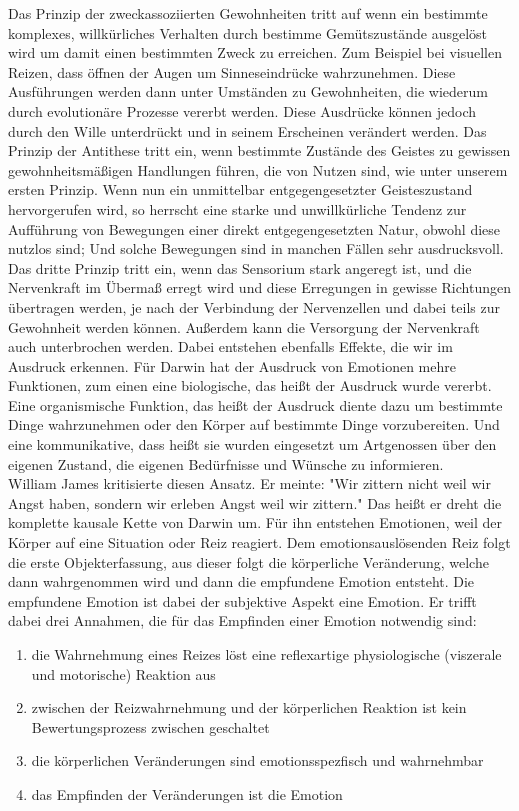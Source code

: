 Das Prinzip der zweckassoziierten Gewohnheiten tritt auf wenn ein bestimmte komplexes, willkürliches Verhalten durch bestimme Gemütszustände ausgelöst wird um damit einen bestimmten Zweck zu erreichen. Zum Beispiel bei visuellen Reizen, dass öffnen der Augen um Sinneseindrücke wahrzunehmen. Diese Ausführungen werden dann unter Umständen zu Gewohnheiten, die wiederum durch evolutionäre Prozesse vererbt werden. Diese Ausdrücke können jedoch durch den Wille unterdrückt und in seinem Erscheinen verändert werden. Das Prinzip der Antithese tritt ein, wenn bestimmte Zustände des Geistes zu gewissen gewohnheitsmäßigen Handlungen führen, die von Nutzen sind, wie unter unserem ersten Prinzip. Wenn nun ein unmittelbar entgegengesetzter Geisteszustand hervorgerufen wird, so herrscht eine starke und unwillkürliche Tendenz zur Aufführung von Bewegungen einer direkt entgegengesetzten Natur, obwohl diese nutzlos sind; Und solche Bewegungen sind in manchen Fällen sehr ausdrucksvoll. Das dritte Prinzip tritt ein, wenn das Sensorium stark angeregt ist, und die Nervenkraft im Übermaß erregt wird und diese Erregungen in gewisse Richtungen übertragen werden, je nach der Verbindung der Nervenzellen und dabei teils zur Gewohnheit werden können. Außerdem kann die Versorgung der Nervenkraft auch unterbrochen werden. Dabei entstehen ebenfalls Effekte, die wir im Ausdruck erkennen.
Für Darwin hat der Ausdruck von Emotionen mehre Funktionen, zum einen eine biologische, das heißt der Ausdruck wurde vererbt. Eine organismische Funktion, das heißt der Ausdruck diente dazu um bestimmte Dinge wahrzunehmen oder den Körper auf bestimmte Dinge vorzubereiten. Und eine kommunikative, dass heißt sie wurden eingesetzt um Artgenossen über den eigenen Zustand, die eigenen Bedürfnisse und Wünsche zu informieren.\\
William James kritisierte diesen Ansatz. Er meinte: "Wir zittern nicht weil wir Angst haben, sondern wir erleben Angst weil wir zittern."
Das heißt er dreht die komplette kausale Kette von Darwin um. Für ihn entstehen Emotionen, weil der Körper auf eine Situation oder Reiz reagiert. Dem emotionsauslösenden Reiz folgt die erste Objekterfassung, aus dieser folgt die körperliche Veränderung, welche dann wahrgenommen wird und dann die empfundene Emotion entsteht. Die empfundene Emotion ist dabei der subjektive Aspekt eine Emotion. 
Er trifft dabei drei Annahmen, die für das Empfinden einer Emotion notwendig sind:
\begin{enumerate}
\item die Wahrnehmung eines Reizes löst eine reflexartige physiologische (viszerale und motorische) Reaktion aus
\item zwischen der Reizwahrnehmung und der körperlichen Reaktion ist kein Bewertungsprozess zwischen geschaltet
\item die körperlichen Veränderungen sind emotionsspezfisch und wahrnehmbar
\item das Empfinden der Veränderungen ist die Emotion
\end{enumerate}
